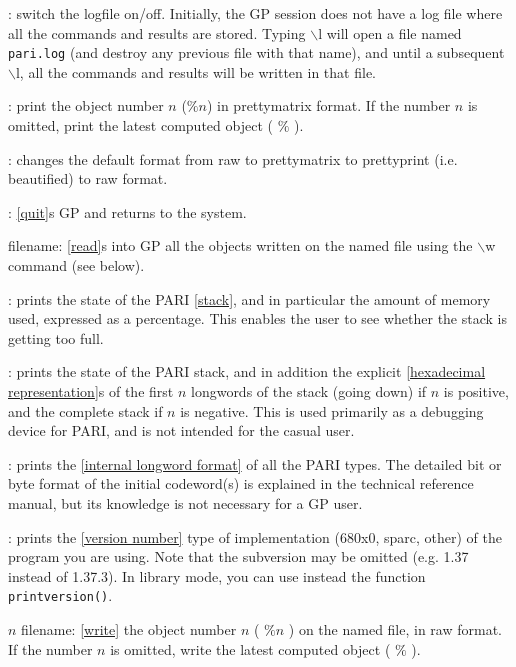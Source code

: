 : switch the logfile on/off. Initially, the GP
session does not have a log file where all the commands and results are stored.
Typing $\backslash$l will open a file named {\tt pari.log} (and destroy any
previous file with that name), and until a subsequent $\backslash$l, all the
commands and results will be written in that file.

: print the object number $n$ ($\%n$)
in prettymatrix format. If the number $n$ is omitted, print the latest
computed object ( $\%$ ).

: changes the default format from raw
 to prettymatrix to
prettyprint (i.e. beautified) to raw format.

: \ref{quit}s GP and returns to the system.

 filename: \ref{read}s into GP all the objects written
 on the named file using the $\backslash$w command (see below).

: prints the state of the PARI \ref{stack}, and
in
particular the amount of memory used, expressed as a percentage. This enables
the user to see whether the stack is getting too full.

: prints the state of the PARI
stack,
and in addition the explicit \ref{hexadecimal representation}s of the first $n$
longwords of the stack (going down) if $n$ is positive, and the complete
stack
if $n$ is negative. This is used primarily as a debugging device for PARI,
and is not intended for the casual user.

: prints the \ref{internal longword format}
of all the PARI types. The detailed bit or byte format of the initial
codeword(s) is explained in the technical reference manual, but its knowledge
is not necessary for a GP user.

: prints the \ref{version number} type of
implementation (680x0, sparc, other) of the program you are using. Note
that the subversion may be omitted (e.g. 1.37 instead of 1.37.3). In library
mode, you can use instead the function {\tt printversion()}.

$n$ filename: \ref{write} the object number $n$
( $\%n$ ) on the named file, in raw format. If the number $n$ is omitted,
write the latest computed object ( $\%$ ).

